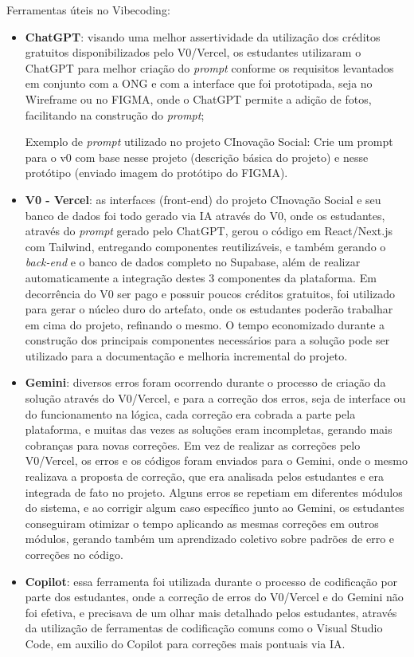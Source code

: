 Ferramentas úteis no Vibecoding:
\begin{itemize}
    \item \textbf{ChatGPT}: visando uma melhor assertividade da utilização dos créditos gratuitos disponibilizados pelo V0/Vercel, os estudantes utilizaram o ChatGPT para melhor criação do \textit{prompt} conforme os requisitos levantados em conjunto com a ONG e com a interface que foi prototipada, seja no Wireframe ou no FIGMA, onde o ChatGPT permite a adição de fotos, facilitando na construção do \textit{prompt};

    Exemplo de \textit{prompt} utilizado no projeto CInovação Social: Crie um prompt para o v0 com base nesse projeto (descrição básica do projeto) e nesse protótipo (enviado imagem do protótipo do FIGMA).
    
    \item \textbf{V0 - Vercel}: as interfaces (front-end) do projeto CInovação Social e seu banco de dados foi todo gerado via IA através do V0, onde os estudantes, através do \textit{prompt} gerado pelo ChatGPT, gerou o código em React/Next.js com Tailwind, entregando componentes reutilizáveis, e também gerando o \textit{back-end} e o banco de dados completo no Supabase, além de realizar automaticamente a integração destes 3 componentes da plataforma. Em decorrência do V0 ser pago e possuir poucos créditos gratuitos, foi utilizado para gerar o núcleo duro do artefato, onde os estudantes poderão trabalhar em cima do projeto, refinando o mesmo. O tempo economizado durante a construção dos principais componentes necessários para a solução pode ser utilizado para a documentação e melhoria incremental do projeto.
    
    \item \textbf{Gemini}: diversos erros foram ocorrendo durante o processo de criação da solução através do V0/Vercel, e para a correção dos erros, seja de interface ou do funcionamento na lógica, cada correção era cobrada a parte pela plataforma, e muitas das vezes as soluções eram incompletas, gerando mais cobranças para novas correções. Em vez de realizar as correções pelo V0/Vercel, os erros e os códigos foram enviados para o Gemini, onde o mesmo realizava a proposta de correção, que era analisada pelos estudantes e era integrada de fato no projeto. Alguns erros se repetiam em diferentes módulos do sistema, e ao corrigir algum caso específico junto ao Gemini, os estudantes conseguiram otimizar o tempo aplicando as mesmas correções em outros módulos, gerando também um aprendizado coletivo sobre padrões de erro e correções no código.
    
    \item \textbf{Copilot}: essa ferramenta foi utilizada durante o processo de codificação por parte dos estudantes, onde a correção de erros do V0/Vercel e do Gemini não foi efetiva, e precisava de um olhar mais detalhado pelos estudantes, através da utilização de ferramentas de codificação comuns como o Visual Studio Code, em auxilio do Copilot para correções mais pontuais via IA.
\end{itemize}

